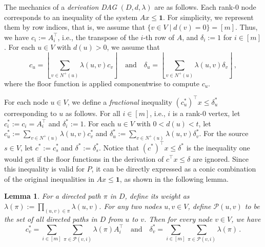 \documentclass[11pt]{article}
\newcommand{\one}{\mathbf{1}}
\newcommand{\rhs}{\delta}
\newtheorem{lemma}[theorem]{Lemma}
\newcommand{\jiaye}[1]{{\color{magenta}Jiaye: {#1} }}
\theoremstyle{remark}
\begin{document}
The mechanics of a \emph{derivation DAG} $(D,d,\lambda)$ are as follows. Each rank-$0$ node corresponds to an inequality of the system $Ax \le \one$. For simplicity, we represent them by row indices, that is, we assume that $\{v \in V \mid d(v) = 0\} = [m]$. Thus, we have $c_i := A^\intercal_i$, i.e., the transpose of the $i$-th row of $A$, and $\rhs_i := 1$ for $i \in [m]$. For each $u \in V$ with $d(u) > 0$, we assume that 
$$
c_u = \left\lfloor \sum_{v \in N^{+}(u)} \lambda(u,v) c_v \right\rfloor \quad \text{and} \quad 
\rhs_u = \left\lfloor \sum_{v \in N^{+}(u)} \lambda(u,v) \rhs_v \right\rfloor\,,
$$
where the floor function is applied componentwise to compute $c_u$. 


For each node $u \in V$, we define a \emph{fractional} inequality $(c^*_u)^\intercal x \le \rhs^*_u$ corresponding to $u$ as follows. 
For all $i \in [m]$, i.e., $i$ is a rank-0 vertex, let $c^*_i := c_i = A^\intercal_i$ and $\rhs^*_i := 1$. For each $u \in V$ with $0<d(u)<t$, let $c^*_u := \sum_{v \in N^{+}(u)} \lambda(u,v) c^*_v$ and $\rhs^*_u := \sum_{v \in N^{+}(u)} \lambda(u,v) \rhs^*_v$. For the source $s \in V$, let $c^* := c^*_s$ and $\rhs^* := \rhs^*_s$. 
Notice that $(c^*)^\intercal x \le \rhs^*$ is the inequality one would get if the floor functions in the derivation of $c^\intercal x \le \rhs$ are ignored. 
Since this inequality is valid for $P$, it can be directly expressed as a conic combination of the original inequalities in $Ax \le \one$, as shown in the following lemma. 

\begin{lemma} \label{lem:decomposition_into_paths}
	For a directed path $\pi$ in $D$, define its weight as $\lambda(\pi) := \prod_{(u,v) \in \pi} \lambda(u,v)$. For any two nodes $u, v \in V$, define $\mathcal{P}(u,v)$ to be the set of all directed paths in $D$ from $u$ to $v$. 
Then for every node $v \in V$, we have
$$
c^*_v = \sum_{i \in [m]} \sum_{\pi \in \mathcal{P}(v,i)} \lambda(\pi) A^\intercal_i
\quad \text{and} \quad
\rhs^*_v = \sum_{i \in [m]} \sum_{\pi \in \mathcal{P}(v,i)} \lambda(\pi)\,.
$$ 
\end{lemma}
\end{document}
